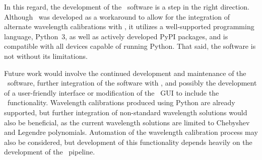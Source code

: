 In this regard, the development of the \stops\ software is a step in the right direction.
Although \stops\ was developed as a workaround to allow for the integration of alternate wavelength calibrations with \polsalt, it utilizes a well-supported programming language, Python~$3$, as well as actively developed \gls{PyPI} packages, and is compatible with all devices capable of running Python.
That said, the software is not without its limitations.

Future work would involve the continued development and maintenance of the \stops\ software, further integration of the software with \polsalt, and possibly the development of a user-friendly interface or modification of the \polsalt\ \gls{GUI} to include the \stops\ functionality.
Wavelength calibrations produced using Python are already supported, but further integration of non-standard wavelength solutions would also be beneficial, as the current wavelength solutions are limited to Chebyshev and Legendre polynomials.
Automation of the wavelength calibration process may also be considered, but development of this functionality depends heavily on the development of the \polsalt\ pipeline.

